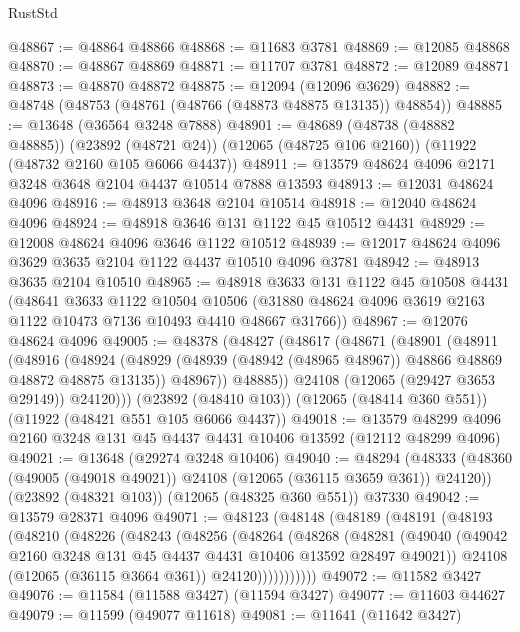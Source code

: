 \begin{lexlean}{RustStd}
\begin{coremodule}
@48867 := @48864 @48866
@48868 := @11683 @3781
@48869 := @12085 @48868
@48870 := @48867 @48869
@48871 := @11707 @3781
@48872 := @12089 @48871
@48873 := @48870 @48872
@48875 := @12094 (@12096 @3629)
@48882 := @48748 (@48753 (@48761 (@48766 (@48873 @48875 @13135)) @48854))
@48885 := @13648 (@36564 @3248 @7888)
@48901 := @48689
    (@48738 (@48882 @48885))
    (@23892 (@48721 @24))
    (@12065 (@48725 @106 @2160))
    (@11922 (@48732 @2160 @105 @6066 @4437))
@48911 := @13579 @48624 @4096 @2171 @3248 @3648 @2104 @4437 @10514 @7888 @13593
@48913 := @12031 @48624 @4096
@48916 := @48913 @3648 @2104 @10514
@48918 := @12040 @48624 @4096
@48924 := @48918 @3646 @131 @1122 @45 @10512 @4431
@48929 := @12008 @48624 @4096 @3646 @1122 @10512
@48939 := @12017 @48624 @4096 @3629 @3635 @2104 @1122 @4437 @10510 @4096 @3781
@48942 := @48913 @3635 @2104 @10510
@48965 := @48918
    @3633
    @131
    @1122
    @45
    @10508
    @4431
    (@48641
      @3633
      @1122
      @10504
      @10506
      (@31880 @48624 @4096 @3619 @2163 @1122 @10473 @7136 @10493 @4410 @48667 @31766))
@48967 := @12076 @48624 @4096
@49005 := @48378
    (@48427
      (@48617
        (@48671
          (@48901
            (@48911
              (@48916
                (@48924
                  (@48929 (@48939 (@48942 (@48965 @48967)) @48866 @48869 @48872 @48875 @13135))
                  @48967))
              @48885))
          @24108
          (@12065 (@29427 @3653 @29149))
          @24120)))
    (@23892 (@48410 @103))
    (@12065 (@48414 @360 @551))
    (@11922 (@48421 @551 @105 @6066 @4437))
@49018 := @13579 @48299 @4096 @2160 @3248 @131 @45 @4437 @4431 @10406 @13592 (@12112 @48299 @4096)
@49021 := @13648 (@29274 @3248 @10406)
@49040 := @48294
    (@48333 (@48360 (@49005 (@49018 @49021)) @24108 (@12065 (@36115 @3659 @361)) @24120))
    (@23892 (@48321 @103))
    (@12065 (@48325 @360 @551))
    @37330
@49042 := @13579 @28371 @4096
@49071 := @48123
    (@48148
      (@48189
        (@48191
          (@48193
            (@48210
              (@48226
                (@48243
                  (@48256
                    (@48264
                      (@48268
                        (@48281
                          (@49040
                            (@49042 @2160 @3248 @131 @45 @4437 @4431 @10406 @13592 @28497 @49021))
                          @24108
                          (@12065 (@36115 @3664 @361))
                          @24120)))))))))))
@49072 := @11582 @3427
@49076 := @11584 (@11588 @3427) (@11594 @3427)
@49077 := @11603 @44627
@49079 := @11599 (@49077 @11618)
@49081 := @11641 (@11642 @3427)

\end{coremodule}
\end{lexlean}
